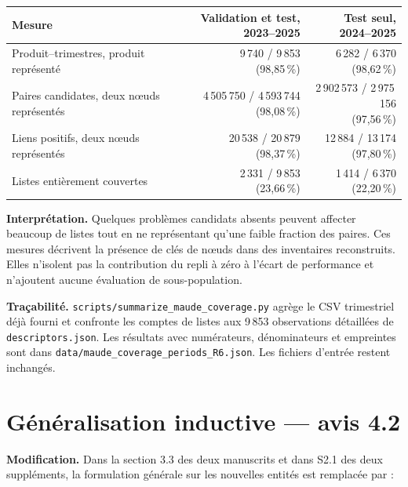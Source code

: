 \documentclass[10pt,a4paper]{article}
\newcommand{\src}[1]{{\small\nolinkurl{#1}}}
\begin{document}
\begin{center}\small
\begin{tabularx}{\linewidth}{@{}Xrr@{}}
\toprule
Mesure & Validation et test, 2023--2025 & Test seul, 2024--2025\\
\midrule
Produit--trimestres, produit représenté & \shortstack{9\,740 / 9\,853\\(98,85\,\%)} & \shortstack{6\,282 / 6\,370\\(98,62\,\%)}\\
Paires candidates, deux nœuds représentés & \shortstack{4\,505\,750 / 4\,593\,744\\(98,08\,\%)} & \shortstack{2\,902\,573 / 2\,975\,156\\(97,56\,\%)}\\
Liens positifs, deux nœuds représentés & \shortstack{20\,538 / 20\,879\\(98,37\,\%)} & \shortstack{12\,884 / 13\,174\\(97,80\,\%)}\\
Listes entièrement couvertes & \shortstack{2\,331 / 9\,853\\(23,66\,\%)} & \shortstack{1\,414 / 6\,370\\(22,20\,\%)}\\
\bottomrule
\end{tabularx}
\end{center}

\textbf{Interprétation.} Quelques problèmes candidats absents peuvent affecter beaucoup de listes tout en ne représentant qu'une faible fraction des paires. Ces mesures décrivent la présence de clés de nœuds dans des inventaires reconstruits. Elles n'isolent pas la contribution du repli à zéro à l'écart de performance et n'ajoutent aucune évaluation de sous-population.

\textbf{Traçabilité.} \src{scripts/summarize_maude_coverage.py} agrège le CSV trimestriel déjà fourni et confronte les comptes de listes aux 9\,853 observations détaillées de \src{descriptors.json}. Les résultats avec numérateurs, dénominateurs et empreintes sont dans \src{data/maude_coverage_periods_R6.json}. Les fichiers d'entrée restent inchangés.

\clearpage
\section{Généralisation inductive — avis 4.2}

\textbf{Modification.} Dans la section 3.3 des deux manuscrits et dans S2.1 des deux suppléments, la formulation générale sur les nouvelles entités est remplacée par :
\end{document}

